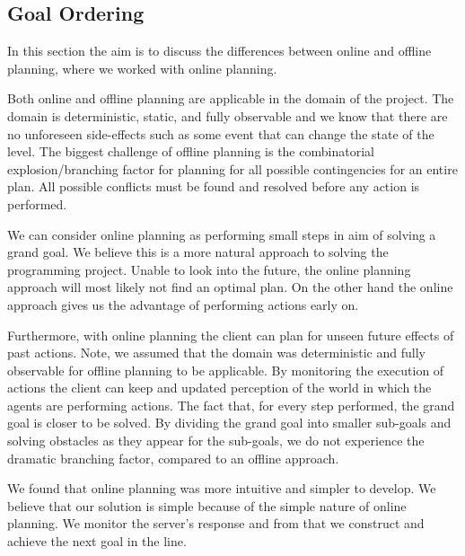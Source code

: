 \subsection{Goal Ordering}
\label{subsec:disc_goal_ordering}

In this section the aim is to discuss the differences between online and offline planning, where we worked with online planning.

Both online and offline planning are applicable in the domain of the project.
The domain is deterministic, static, and fully observable and we know that there are no unforeseen side-effects such as some event that can change the state of the level.
The biggest challenge of offline planning is the combinatorial explosion/branching factor for planning for all possible contingencies for an entire plan.
All possible conflicts must be found and resolved before any action is performed.

We can consider online planning as performing small steps in aim of solving a grand goal.
We believe this is a more natural approach to solving the programming project.
Unable to look into the future, the online planning approach will most likely not find an optimal plan.
On the other hand the online approach gives us the advantage of performing actions early on.

Furthermore, with online planning the client can plan for unseen future effects of past actions.
Note, we assumed that the domain was deterministic and fully observable for offline planning to be applicable.
By monitoring the execution of actions the client can keep and updated perception of the world in which the agents are performing actions.
The fact that, for every step performed, the grand goal is closer to be solved.
By dividing the grand goal into smaller sub-goals and solving obstacles as they appear for the sub-goals, we do not experience the dramatic branching factor, compared to an offline approach.

We found that online planning was more intuitive and simpler to develop.
We believe that our solution is simple because of the simple nature of online planning.
We monitor the server's response and from that we construct and achieve the next goal in the line.

